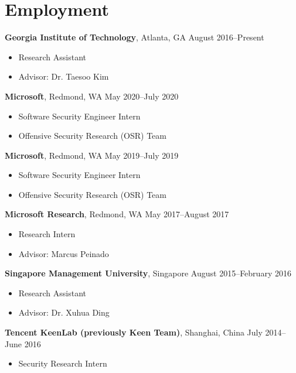 \section*{Employment}

\begin{description}
\item {\bf Georgia Institute of Technology}, Atlanta, GA
\dotfill August 2016--Present
  \begin{itemize}
  \item Research Assistant
  \item Advisor: Dr. Taesoo Kim
  \end{itemize}

 \item {\bf Microsoft}, Redmond, WA \dotfill May 2020--July 2020
  \begin{itemize}
  \item Software Security Engineer Intern
  \item Offensive Security Research (OSR) Team
  \end{itemize}

 \item {\bf Microsoft}, Redmond, WA \dotfill May 2019--July 2019
  \begin{itemize}
  \item Software Security Engineer Intern
  \item Offensive Security Research (OSR) Team
  \end{itemize}
 
\item {\bf Microsoft Research}, Redmond, WA \dotfill May 2017--August 2017
  \begin{itemize}
  \item Research Intern
  \item Advisor: Marcus Peinado
  \end{itemize}

\item {\bf Singapore Management University}, Singapore \dotfill August 2015--February 2016
  \begin{itemize}
  \item Research Assistant
  \item Advisor: Dr. Xuhua Ding
  \end{itemize}

\item {\bf Tencent KeenLab (previously Keen Team)}, Shanghai, China \dotfill July 2014--June 2016
	\begin{itemize}
	\item Security Research Intern
	\end{itemize}
\end{description}
